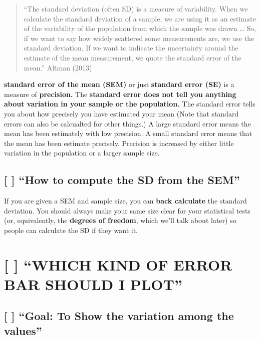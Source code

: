 \documentclass[]{book}
\theoremstyle{definition}
\theoremstyle{definition}
\theoremstyle{definition}
\theoremstyle{remark}
\begin{document}
\begin{quote}
``The standard deviation (often SD) is a measure of variability. When we
calculate the standard deviation of a sample, we are using it as an
estimate of the variability of the population from which the sample was
drawn \ldots{} So, if we want to say how widely scattered some
measurements are, we use the standard deviation. If we want to indicate
the uncertainty around the estimate of the mean measurement, we quote
the standard error of the mean.'' Altman (2013)
\end{quote}

\textbf{standard error of the mean (SEM)} or just \textbf{standard error
(SE)} is a measure of \textbf{precision.} The \textbf{standard error
does not tell you anything about variation in your sample or the
population.} The standard error tells you about how precisely you have
estimated your mean (Note that standard errors can also be calcualted
for other things.) A large standard error means the mean has been
estimately with low precision. A small standard error means that the
mean has been estimate precisely. Precision is increased by either
little variation in the population or a larger sample size.

\subsection{\texorpdfstring{{[} {]} ``How to compute the SD from the
SEM''}{{[} {]} How to compute the SD from the SEM}}\label{how-to-compute-the-sd-from-the-sem}

If you are given a SEM and sample size, you can \textbf{back calculate}
the standard deviation. You should always make your same size clear for
your statistical tests (or, equivalently, the \textbf{degrees of
freedom}, which we'll talk about later) so people can calculate the SD
if they want it.

\section{\texorpdfstring{{[} {]} ``WHICH KIND OF ERROR BAR SHOULD I
PLOT''}{{[} {]} WHICH KIND OF ERROR BAR SHOULD I PLOT}}\label{which-kind-of-error-bar-should-i-plot}

\subsection{\texorpdfstring{{[} {]} ``Goal: To Show the variation among
the
values''}{{[} {]} Goal: To Show the variation among the values}}\label{goal-to-show-the-variation-among-the-values}
\end{document}
